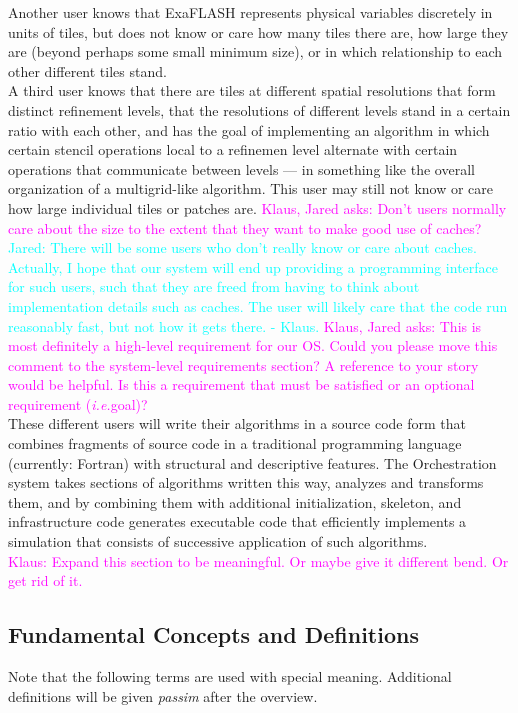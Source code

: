 \documentclass{article}
\newcommand{\FlashOfTheFuture}{ExaFLASH\xspace}
\newcommand{\ie}{\textit{i.e.}}   %
\newcommand{\JaredRfromKW}[1]   {\textcolor{cyan}{Jared: #1 - Klaus.}}
\newcommand{\Klaus}[1]          {\textcolor{magenta}{Klaus: #1}}
\newcommand{\KlausQfromJO}[1]   {\textcolor{magenta}{Klaus, Jared asks: #1}}
\begin{document}
Another user
knows that \FlashOfTheFuture represents physical variables discretely
in units of tiles, but does not know or care how many tiles there are,
how large they are (beyond perhaps some small minimum size), or in which
relationship to each other different tiles stand.\\

A third user knows that there are tiles at different spatial
resolutions that form distinct refinement levels, that the resolutions
of different levels stand in a certain ratio with each other, and has the
goal of implementing an algorithm in which certain stencil operations
local to a refinemen level alternate with certain operations that
communicate between levels --- in something like
the overall organization of a multigrid-like
algorithm. This user may still not know or care how large individual
tiles or patches are.  \KlausQfromJO{Don't users normally care about the size to the extent
that they want to make good use of caches?}
\JaredRfromKW{There will be some users who don't really know or care about caches.
Actually, I hope that our system will end up providing a programming interface
for such users, such that they are freed from having to think about implementation details
such as caches. The user will likely care that the code run reasonably fast,
but not how it gets there.}
\KlausQfromJO{This is most definitely a high-level requirement for our OS.
Could you please move this comment to the system-level requirements section?  A
reference to your story would be helpful.  Is this a requirement that must be
satisfied or an optional requirement (\ie goal)?}
\\

These different users will write their algorithms in a source code form
that combines fragments of source code in a traditional programming language (currently: Fortran)
with structural and descriptive features. The Orchestration system takes
sections of algorithms written this way, analyzes and transforms them,
and by combining them with additional initialization, skeleton, and infrastructure code
generates executable code that efficiently implements a simulation
that consists of successive application of such algorithms.\\

\Klaus{Expand this section to be meaningful. Or maybe give it different bend.
Or get rid of it.}

\subsection{Fundamental Concepts and Definitions}
Note that the following terms are used with special meaning. Additional definitions will be given
\textit{passim} after the overview.
\end{document}
